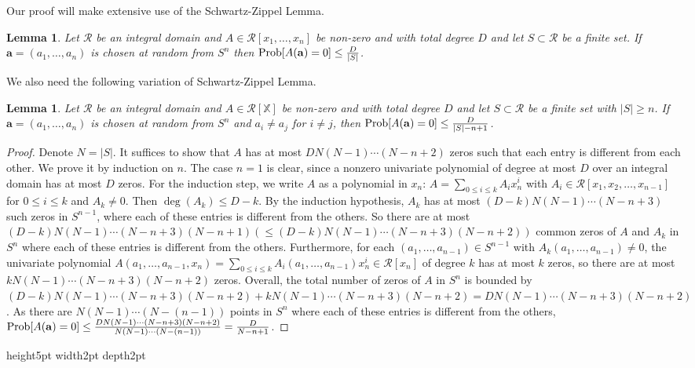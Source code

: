\documentclass[final,20pt]{elsarticle}
\newtheorem{lemma}[theorem]{Lemma}
\def\X{{\mathbb{X}}}
\def\qed{\hfil {\vrule height5pt width2pt depth2pt}}
\begin{document}
Our proof will make extensive use of the Schwartz-Zippel Lemma.
\begin{lemma}\label{lm-6}\cite[Lemma 6.44]{GaGer13} Let $\mathcal{R}$ be an integral domain  and $A \in \mathcal{R}[x_1,\dots,x_n]$
be non-zero and with total degree $D$ and let $S\subset \mathcal{R}$ be a finite set. If $\mathbf{a}=(a_1,\dots,a_n)$ is chosen at random from $S^n$ then ${\rm Prob}[A(\mathbf{a})=0]\leq \frac{D}{|S|}$.
\end{lemma}

We also need the following variation of Schwartz-Zippel Lemma.

\begin{lemma}\label{lm-8}
Let $\mathcal{R}$ be an integral domain and $A \in \mathcal{R}[\X]$
be non-zero and with total degree $D$ and let $S\subset \mathcal{R}$ be a finite set with $|S|\geq n$. If $\mathbf{a}=(a_1,\dots,a_n)$ is chosen at random from $S^n$ and $a_i\neq a_j$ for $i\neq j$, then ${\rm Prob}[A(\mathbf{a})=0]\leq \frac{D}{|S|-n+1}$.
\end{lemma}
\begin{proof}
Denote $N=|S|$. It suffices to show that $A$ has at most $DN(N-1)\cdots (N-n+2)$ zeros such that each entry is different from each other.
%
We prove it by induction on $n$. The case $n=1$ is clear, since a nonzero univariate polynomial of degree at most $D$ over an integral domain has at most $D$ zeros.
%
For the induction step, we write $A$ as a polynomial in $x_n$: $A=\sum_{0\leq i\leq k}A_ix_n^i$ with $A_i\in \mathcal{R}[x_1,x_2,\dots,x_{n-1}]$ for $0\leq i\leq k$ and $A_k\neq 0$. Then $\deg(A_k)\leq D-k$.
By the induction hypothesis, $A_k$ has at most $(D-k)N(N-1)\cdots (N-n+3)$ such zeros in $S^{n-1}$, where each of these entries is different from the others. So there are at most $(D-k)N(N-1)\cdots (N-n+3)(N-n+1)(\leq(D-k)N(N-1)\cdots(N-n+3)(N-n+2))$ common zeros of $A$ and $A_k$ in $S^n$ where each of these entries is different from the others.
Furthermore, for each $(a_1,\dots,a_{n-1})\in S^{n-1}$ with $A_k(a_1,\dots,a_{n-1})\neq 0$, the univariate polynomial $A(a_1,\dots,a_{n-1},x_n)=\sum_{0\leq i\leq k}A_i(a_1,\dots,a_{n-1})x_n^i\in \mathcal{R}[x_n]$ of degree $k$ has at most $k$ zeros, so there are at most $k N(N-1)\cdots (N-n+3)(N-n+2)$ zeros.
%
Overall, the total number of zeros of $A$ in $S^n$ is bounded by $(D-k)N(N-1)\cdots (N-n+3)(N-n+2)+k N(N-1)\cdots (N-n+3)(N-n+2)=D N(N-1)\cdots (N-n+3)(N-n+2)$.
%
As there are $N(N-1)\cdots (N-(n-1))$ points in $S^n$ where each of these entries is different from the others, ${\rm Prob}[A(\mathbf{a})=0]\leq \frac{D N(N-1)\cdots (N-n+3)(N-n+2)}{N(N-1)\cdots (N-(n-1))}=\frac{D}{N-n+1}$.
\end{proof}\qed
\end{document}
